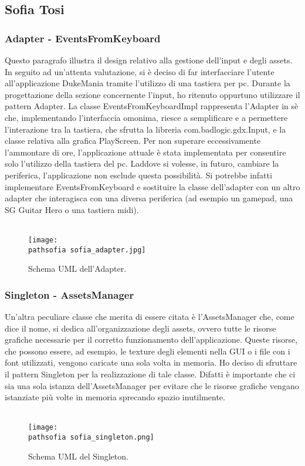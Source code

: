 \documentclass[a4paper,12pt]{report}
\newcommand\pathsofia{img/sofia/}
\begin{document}
\subsection{Sofia Tosi}
\subsubsection{Adapter - EventsFromKeyboard}
Questo paragrafo illustra il design relativo alla gestione dell'input e degli assets.
In seguito ad un'attenta valutazione, si è deciso di far interfacciare l'utente all'applicazione DukeMania tramite l'utilizzo di
una tastiera per pc. 
Durante la progettazione della sezione concernente l'input, ho ritenuto oppurtuno utilizzare il pattern Adapter.
La classe EventsFromKeyboardImpl rappresenta l'Adapter in sè che, implementando l'interfaccia omonima, riesce a semplificare e a permettere l'interazione
tra la tastiera, che sfrutta la libreria com.badlogic.gdx.Input, e la classe relativa alla grafica PlayScreen.
Per non superare eccessivamente l'ammontare di ore, l'applicazione attuale è stata implementata per consentire solo l'utilizzo della tastiera del pc. 
Laddove si volesse, in futuro, cambiare la periferica, l'applicazione non esclude questa possibilità. Si potrebbe infatti implementare EventsFromKeyboard 
e sostituire la classe dell'adapter con un altro adapter che interagisca con una diversa periferica (ad esempio un gamepad, una SG Guitar Hero o una tastiera midi). \\ \\
\newline
\begin{figure}[!htb]
	\centerline{\texttt{[image: \\pathsofia sofia\_adapter.jpg]}}
	\caption{Schema UML dell'Adapter.}
	\label{img:adapter}
\end{figure}
\clearpage \hfill\break
\subsubsection{Singleton - AssetsManager}
Un'altra peculiare classe che merita di essere citata è l'AssetsManager che, come dice il nome, si dedica all'organizzazione degli assets, ovvero tutte le risorse grafiche
necessarie per il corretto funzionamento dell'applicazione. Queste risorse, che possono essere, ad esempio, le texture degli elementi nella GUI o i file con i font utilizzati,
vengono caricate una sola volta in memoria.
Ho deciso di sfruttare il pattern Singleton per la realizzazione di tale classe. Difatti è importante che ci sia una sola istanza dell'AssetsManager per evitare che le risorse 
grafiche vengano istanziate più volte in memoria sprecando spazio inutilmente. \\ \\
\newline
\begin{figure}[!htb]
	\centerline{\texttt{[image: \\pathsofia sofia\_singleton.png]}}
	\caption{Schema UML del Singleton.}
	\label{img:singleton}
\end{figure}
\clearpage \hfill\break
\end{document}
